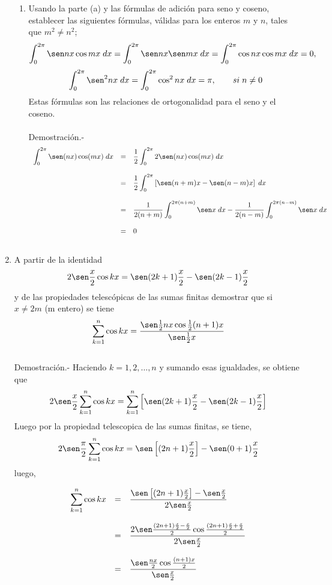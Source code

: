 \begin{enumerate}
\begin{enumerate}[\bfseries (a)]
    \item Usando la parte (a) y las fórmulas de adición para seno y coseno, establecer las siguientes fórmulas, válidas para los enteros $m$ y $n$, tales que $m^2 \neq n^2$;
	$$\int_0^{2\pi} \sen nx \cos mx \; dx = \int_0^{2\pi} \sen nx \sen mx \; dx = \int_0^{2\pi} \cos nx \cos mx \; dx = 0,$$
	$$\int_0^{2\pi} \sen^2 nx \; dx = \int_0^{2\pi} \cos^2 nx \; dx = \pi, \qquad si \; n\neq 0$$
	Estas fórmulas son las relaciones de ortogonalidad para el seno y el coseno.\\\\
	Demostración.-\; 
	$$\begin{array}{rcl}
	    \displaystyle\int_0^{2\pi} \sen(nx)\cos(mx)\; dx&=&\dfrac{1}{2}\displaystyle\int_0^{2\pi}2\sen(nx)\cos(mx)\; dx\\\\
							    &=&\dfrac{1}{2}\displaystyle\int_0^{2\pi} \left[\sen(n+m)x - \sen(n-m)x\right]\; dx\\\\
							    &=&\dfrac{1}{2(n+m)}\displaystyle\int_0^{2\pi(n+m)} \sen x\; dx - \dfrac{1}{2(n-m)}\displaystyle\int_0^{2\pi(n-m)} \sen x\; dx\\\\
							    &=&0\\\\
	\end{array}$$

\end{enumerate}

\item A partir de la identidad 
    $$2\sen \dfrac{x}{2} \cos kx = \sen(2k+1)\dfrac{x}{2} - \sen(2k-1)\dfrac{x}{2}$$
    y de las propiedades telescópicas de las sumas finitas demostrar que si $x\neq 2m$ (m entero) se tiene
    $$\sum_{k=1}^n \cos kx = \dfrac{\sen \frac{1}{2}nx\cos \frac{1}{2}(n+1)x}{\sen\frac{1}{2}x}$$\\
    Demostración.-\; Haciendo $k= 1,2,\ldots, n$ y sumando esas igualdades, se obtiene que
    $$2\sen \dfrac{x}{2} \sum_{k=1}^n \cos kx = \sum_{k=1}^n \left[\sen(2k+1)\dfrac{x}{2} - \sen(2k-1)\dfrac{x}{2}\right]$$
    Luego por la propiedad telescopica de las sumas finitas, se tiene, 
    $$2\sen\dfrac{\pi}{2}\sum\limits_{k=1}^n \cos kx = \sen \left[(2n+1)\dfrac{x}{2}\right]-\sen(0+1)\dfrac{x}{2}$$
    luego,

    $$\begin{array}{rcl}
	\displaystyle\sum_{k=1}^n \cos kx&=&\dfrac{\sen \left[(2n+1)\frac{x}{2}\right]-\sen\frac{x}{2}}{2\sen \frac{x}{2}}\\\\
					 &=&\dfrac{2\sen\frac{(2n+1)\frac{x}{2}-\frac{x}{2}}{2}\cos \frac{(2n+1)\frac{x}{2}+\frac{x}{2}}{2}}{2\sen\frac{x}{2}}\\\\
					 &=&\dfrac{\sen\frac{nx}{2}\cos\frac{(n+1)x}{2}}{\sen\frac{x}{2}}\\\\
    \end{array}$$


\end{enumerate}
